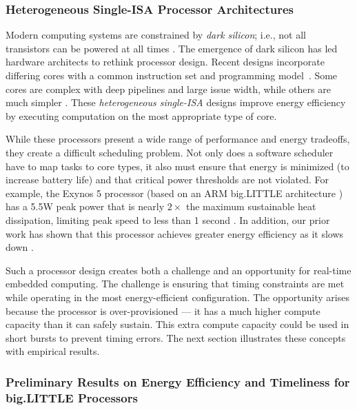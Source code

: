  
\subsubsection{Heterogeneous Single-ISA Processor Architectures}
Modern computing systems are constrained by \emph{dark silicon}; i.e.,
not all transistors can be powered at all times
\cite{DaSi2011,Venkatesh2010}.  The emergence of dark silicon has led
hardware architects to rethink processor design.  Recent designs
incorporate differing cores with a common instruction set and
programming model~\cite{Kumar.2005.heterogeneous,SulemanMQP09}.  Some
cores are complex with deep pipelines and large issue width, while
others are much simpler \cite{bigLittle}.  These \emph{heterogeneous
  single-ISA} designs improve energy efficiency by executing
computation on the most appropriate type of core.

While these processors present a wide range of performance and energy
tradeoffs, they create a difficult scheduling problem.  Not only does
a software scheduler have to map tasks to core types, it also must
ensure that energy is minimized (to increase battery life) and that
critical power thresholds are not violated.  For example, the Exynos
5 processor (based on an ARM big.LITTLE architecture \cite{bigLittle})
has a 5.5W peak power that is nearly $2 \times$ the maximum
sustainable heat dissipation, limiting peak speed to less than 1
second \cite{exynos5}.  In addition, our prior work has shown that
this processor achieves greater energy efficiency as it slows down
\cite{Imes2014,Imes2014a}.  

Such a processor design creates both a challenge and an opportunity
for real-time embedded computing. The challenge is ensuring that
timing constraints are met while operating in the most
energy-efficient configuration.  The opportunity arises because the
processor is over-provisioned --- it has a much higher compute
capacity than it can safely sustain.  This extra compute capacity
could be used in short bursts to prevent timing errors.  The next
section illustrates these concepts with empirical results.

\subsubsection{Preliminary Results on Energy Efficiency and Timeliness
  for big.LITTLE Processors}

